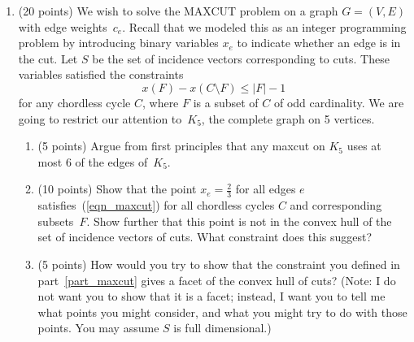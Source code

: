 \documentclass[12pt]{article}
\begin{document}
\begin{enumerate}
  \newpage
\item (20 points)
We wish to solve the MAXCUT problem on
a graph $G=(V,E)$ with edge weights~$c_e$.
Recall that we modeled this as an integer programming problem
by introducing binary variables $x_e$ to indicate whether an edge is
in the cut.
Let $S$ be the set of incidence vectors corresponding to cuts.
These variables satisfied the constraints
\begin{equation}
\label{eqn_maxcut}
x(F)-x(C\setminus F) \leq |F|-1
\end{equation}
for any chordless cycle $C$, where $F$ is a subset of $C$ of odd cardinality.
We are going to restrict our attention to~$K_5$,
the complete graph on 5 vertices.
\begin{enumerate}
\item (5 points)
Argue from first principles that any maxcut on $K_5$ uses at most
6 of the edges of~$K_5$.
\item (10 points)
\label{part_maxcut}
Show that the point $x_e=\frac{2}{3}$ for all edges $e$
satisfies~(\ref{eqn_maxcut}) for all chordless cycles $C$ and corresponding
subsets~$F$.
Show further that this point is not in the convex hull of the set of
incidence vectors of cuts.
What constraint does this suggest?
\item
(5 points)
How would you try to show that the constraint you defined in
part~\ref{part_maxcut}
gives a facet of the convex hull of cuts?
(Note: I do not want you to show that it is a facet;
instead, I want you to tell me what points you might consider,
and what you might try to do with those points.
You may assume $S$ is full dimensional.)
\end{enumerate}

\end{enumerate}
\end{document}

